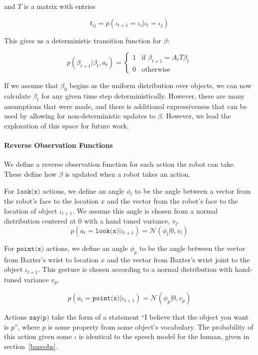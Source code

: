 \documentclass[conference]{IEEEtran}
\begin{document}
and $T$ is a matrix with entries

\begin{equation*}
	t_{ij} = p(\iota_{t+1} = \iota_i | \iota_{t} = \iota_j)
\end{equation*}
		


This gives us a deterministic transition function for $\beta$: 

\begin{equation}
	p(\beta_{t+1} | \beta_t, a_t) = \begin{cases}
		1 & \text{if } \beta_{t+1} = A_t T \beta_t \\
		0 & \text{otherwise}
	\end{cases}
\end{equation}

If we assume that $\beta_0$ begins as the uniform distribution over objects, we can now calculate $\beta_t$ for any given time step deterministically. However, there are many assumptions that were made, and there is additional expressiveness that can be used by allowing for non-deterministic updates to $\beta$. However, we lead the exploration of this space for future work. 

\paragraph{Reverse Observation Functions} \label{reverse}

We define a reverse observation function for each action the robot can take. These define how $\beta$ is updated when a robot takes an action. 

For $\texttt{look(x)}$ actions, we define an angle $\phi_l$ to be the angle between a vector from the robot's face to the location $x$ and the vector from the robot's face to the location of object $\iota_{t+1}$. We assume this angle is chosen from a normal distribution centered at 0 with a hand tuned variance, $v_l$. 
$$p(a_{t} = \texttt{look(x)} | \iota_{t+1}) = \mathcal{N}(\phi_l | 0, v_{l})$$

For $\texttt{point(x)}$ actions, we define an angle $\phi_p$ to be the angle between the vector from Baxter's wrist to location $x$ and the vector from Baxter's wrist joint to the object $\iota_{t+1}$. This gesture is chosen according to a normal distribution with hand-tuned variance $v_p$. 

$$p(a_{t} = \texttt{point(x)} | \iota_{t+1}) = \mathcal{N}(\phi_p | 0, v_{p})$$

Actions $\texttt{say(p)}$ take the form of a statement ``I believe that the object you want is $p$'', where $p$ is some property from some object's vocabulary. The probability of this action given some $\iota$ is identical to the speech model for the human, given in section~\ref{baseobs}. 
\end{document}

